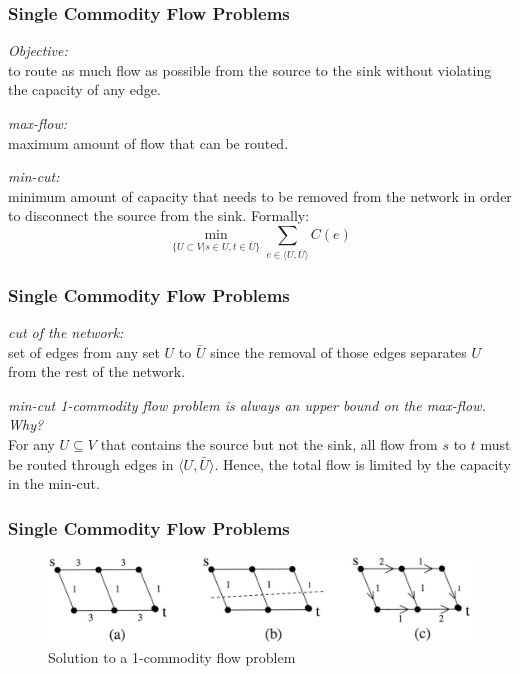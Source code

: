 \begin{frame}
\frametitle{Single Commodity Flow Problems}
\textit{Objective:}\\
to route as much flow as possible from the source to the sink without violating the capacity of any edge.

\textit{max-flow:}\\
maximum amount of flow that can be routed.

\textit{min-cut:}\\
minimum amount of capacity that needs to be removed from the network in order to disconnect the source from the sink. Formally:
$$\min_{ \{ U \subset V | s \in U, t \in \bar{U} \} } \sum_{e \in \langle U, \bar{U} \rangle } C(e)$$
\end{frame}

\begin{frame}
\frametitle{Single Commodity Flow Problems}
\textit{cut of the network:}\\
set of edges from any set $U$ to $\bar{U}$ since the removal of those edges separates $U$ from the rest of the network.

\textit{min-cut 1-commodity flow problem is always an upper bound on the max-flow. Why?}\\
For any $U \subseteq V$ that contains the source but not the sink, all flow from $s$ to $t$ must be routed through edges in  $\langle U, \bar{U} \rangle $. Hence, the total flow is limited by the capacity in the min-cut.
\end{frame}


\begin{frame}[c]
\frametitle{Single Commodity Flow Problems}
	\begin{figure}
		\centering
		\includegraphics[width=\textwidth]{figs/1-commodity_flow_problem.png}
		\caption{Solution to a 1-commodity flow problem}
		\end{figure}
\end{frame}


